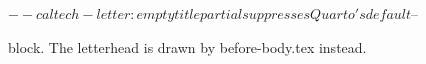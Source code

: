 $-- caltech-letter: empty title partial suppresses Quarto's default
$-- \maketitle block. The letterhead is drawn by before-body.tex instead.

